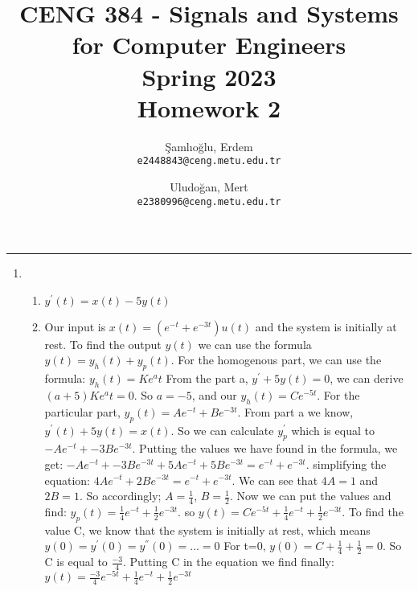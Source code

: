 \documentclass[10pt,a4paper, margin=1in]{article}
\author{
  Şamlıoğlu, Erdem\\
  \texttt{e2448843@ceng.metu.edu.tr}
  \and
  Uludoğan, Mert\\
  \texttt{e2380996@ceng.metu.edu.tr}
}
\title{CENG 384 - Signals and Systems for Computer Engineers \\
Spring 2023 \\
Homework 2}
\begin{document}
\maketitle



\noindent\rule{19cm}{1.2pt}

\begin{enumerate}

\item %
    \begin{enumerate}
    \item $y^{'}(t)=x(t) - 5y(t)$
    \item Our input is $x(t)=(e^{-t}+e^{-3t})u(t)$ and the system is initially at rest. To find the output $y(t)$ we can use the formula $y(t)= y_h(t) + y_p(t)$. For the homogenous part, we can use the formula: $y_h(t)=Ke^{a}t$ From the part a, $y^{'}+5y(t)=0$, we can derive $(a+5)Ke^{a}t=0$. So $a=-5$, and our $y_h(t)=Ce^{-5t}$. \newline
    For the particular part, $y_p(t)=Ae^{-t}+ Be^{-3t}$. From part a we know, $y^{'}(t)+5y(t)=x(t)$. So we can calculate $y_p^{'}$ which is equal to $-Ae^{-t}+ -3Be^{-3t}$. Putting the values we have found in the formula, we get: \newline
    $-Ae^{-t}+ -3Be^{-3t} + 5Ae^{-t}+ 5Be^{-3t}=e^{-t}+ e^{-3t}$. simplifying the equation:\newline
    $4Ae^{-t}+ 2Be^{-3t}=e^{-t}+ e^{-3t}$. We can see that $4A=1$ and $2B=1$. So accordingly; $A=\frac{1}{4}$, $B=\frac{1}{2}$. Now we can put the values and find: \newline
    $y_p(t)=\frac{1}{4}e^{-t}+\frac{1}{2}e^{-3t}$. so $y(t)=Ce^{-5t} + \frac{1}{4}e^{-t}+\frac{1}{2}e^{-3t}$. To find the value C, we know that the system is initially at rest, which means $y(0)=y^{'}(0)= y^{''}(0)=...=0$ For t=0, $y(0)=C+\frac{1}{4} + \frac{1}{2}=0 $. So C is equal to $\frac{-3}{4}$. Putting C in the equation we find finally: \newline
    $y(t)=\frac{-3}{4}e^{-5t} + \frac{1}{4}e^{-t}+\frac{1}{2}e^{-3t}$
    
    
    
    
    
    
    \end{enumerate}


\end{enumerate}
\end{document}
